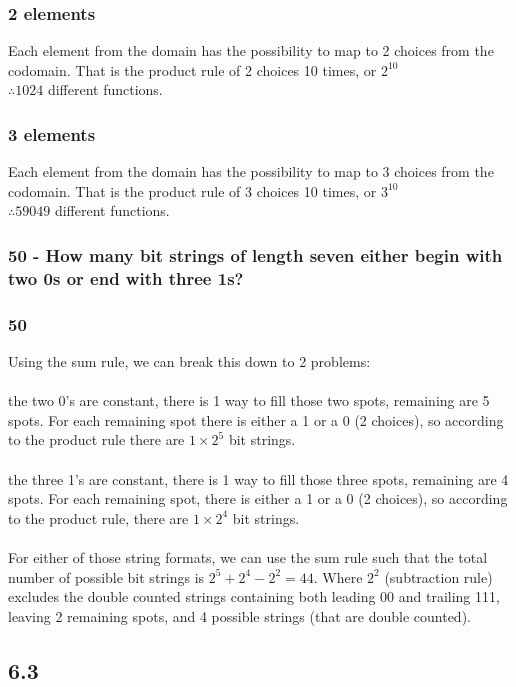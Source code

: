 \documentclass{article}
\begin{document}
\subsubsection[34a]{2 elements}
Each element from the domain has the possibility to map to 2 choices from the codomain. That is the product rule of 2 choices 10 times, or $2^{10}$\\$\therefore 1024$ different functions.
\subsubsection[34b]{3 elements}
Each element from the domain has the possibility to map to 3 choices from the codomain. That is the product rule of 3 choices 10 times, or $3^{10}$\\$\therefore 59049$ different functions.

\subsubsection*{50 - How many bit strings of length seven either begin with
two 0s or end with three 1s?}
\subsubsection{50}
Using the sum rule, we can break this down to 2 problems:\\
\\
the two 0's are constant, there is 1 way to fill those two spots, remaining are 5 spots. For each remaining spot there is either a 1 or a 0 (2 choices), so according to the product rule there are $1 \times 2^5$ bit strings.\\
\\
the three 1's are constant, there is 1 way to fill those three spots, remaining are 4 spots. For each remaining spot, there is either a 1 or a 0 (2 choices), so according to the product rule, there are $1 \times 2^4$ bit strings.\\
\\
For either of those string formats, we can use the sum rule such that the total number of possible bit strings is $2^5 + 2^4 - 2^2 = 44$. Where $2^2$ (subtraction rule) excludes the double counted strings containing both leading 00 and trailing 111, leaving 2 remaining spots, and 4 possible strings (that are double counted).

\subsection{6.3}
\end{document}
